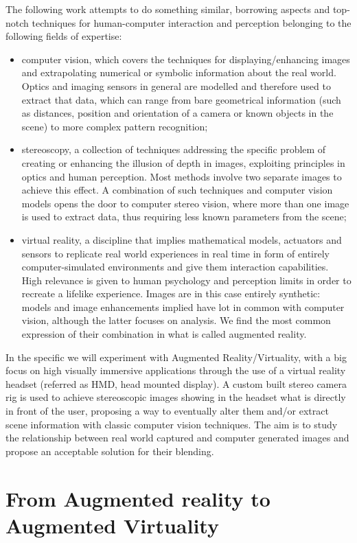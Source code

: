 The following work attempts to do something similar, borrowing aspects and top-notch techniques for human-computer interaction and perception belonging to the following fields of expertise:
\begin{itemize}
\item computer vision, which covers the techniques for displaying/enhancing images and extrapolating numerical or symbolic information about the real world. Optics and imaging sensors in general are modelled and therefore used to extract that data, which can range from bare geometrical information (such as distances, position and orientation of a camera or known objects in the scene) to more complex pattern recognition;

\item stereoscopy, a collection of techniques addressing the specific problem of creating or enhancing the illusion of depth in images, exploiting principles in optics and human perception. Most methods involve two separate images to achieve this effect. A combination of such techniques and computer vision models opens the door to computer stereo vision, where more than one image is used to extract data, thus requiring less known parameters from the scene;
\item virtual reality, a discipline that implies mathematical models, actuators and sensors to replicate real world experiences in real time in form of entirely computer-simulated environments and give them interaction capabilities. High relevance is given to human psychology and perception limits in order to recreate a lifelike experience. Images are in this case entirely synthetic: models and image enhancements implied have lot in common with computer vision, although the latter focuses on analysis. We find the most common expression of their combination in what is called augmented reality.
\end{itemize}
In the specific we will experiment with Augmented Reality/Virtuality, with a big focus on high visually immersive applications through the use of a virtual reality headset (referred as HMD, head mounted display). A custom built stereo camera rig is used to achieve stereoscopic images showing in the headset what is directly in front of the user, proposing a way to eventually alter them and/or extract scene information with classic computer vision techniques. The aim is to study the relationship between real world captured and computer generated images and propose an acceptable solution for their blending.

\section{From Augmented reality to Augmented Virtuality}

